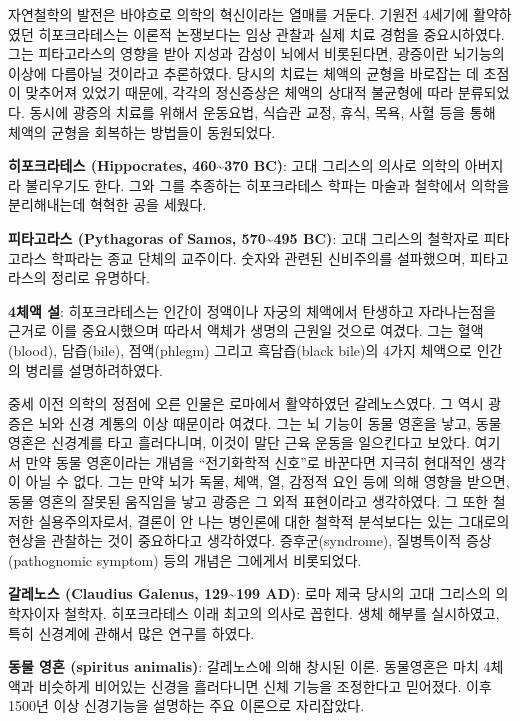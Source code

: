 \documentclass[
]{article}
\begin{document}
자연철학의 발전은 바야흐로 의학의 혁신이라는 열매를 거둔다. 기원전
4세기에 활약하였던 히포크라테스는 이론적 논쟁보다는 임상 관찰과 실제
치료 경험을 중요시하였다. 그는 피타고라스의 영향을 받아 지성과 감성이
뇌에서 비롯된다면, 광증이란 뇌기능의 이상에 다름아닐 것이라고
추론하였다. 당시의 치료는 체액의 균형을 바로잡는 데 초점이 맞추어져
있었기 때문에, 각각의 정신증상은 체액의 상대적 불균형에 따라 분류되었다.
동시에 광증의 치료를 위해서 운동요법, 식습관 교정, 휴식, 목욕, 사혈 등을
통해 체액의 균형을 회복하는 방법들이 동원되었다.

\textbf{히포크라테스 (Hippocrates, 460\textasciitilde370 BC)}: 고대
그리스의 의사로 의학의 아버지라 불리우기도 한다. 그와 그를 추종하는
히포크라테스 학파는 마술과 철학에서 의학을 분리해내는데 혁혁한 공을
세웠다.

\textbf{피타고라스 (Pythagoras of Samos, 570\textasciitilde495 BC)}:
고대 그리스의 철학자로 피타고라스 학파라는 종교 단체의 교주이다. 숫자와
관련된 신비주의를 설파했으며, 피타고라스의 정리로 유명하다.

\textbf{4체액 설}: 히포크라테스는 인간이 정액이나 자궁의 체액에서
탄생하고 자라나는점을 근거로 이를 중요시했으며 따라서 액체가 생명의
근원일 것으로 여겼다. 그는 혈액(blood), 담즙(bile), 점액(phlegm) 그리고
흑담즙(black bile)의 4가지 체액으로 인간의 병리를 설명하려하였다.

중세 이전 의학의 정점에 오른 인물은 로마에서 활약하였던 갈레노스였다. 그
역시 광증은 뇌와 신경 계통의 이상 때문이라 여겼다. 그는 뇌 기능이 동물
영혼을 낳고, 동물 영혼은 신경계를 타고 흘러다니며, 이것이 말단 근육
운동을 일으킨다고 보았다. 여기서 만약 동물 영혼이라는 개념을
``전기화학적 신호''로 바꾼다면 지극히 현대적인 생각이 아닐 수 없다. 그는
만약 뇌가 독물, 체액, 열, 감정적 요인 등에 의해 영향을 받으면, 동물
영혼의 잘못된 움직임을 낳고 광증은 그 외적 표현이라고 생각하였다. 그
또한 철저한 실용주의자로서, 결론이 안 나는 병인론에 대한 철학적
분석보다는 있는 그대로의 현상을 관찰하는 것이 중요하다고 생각하였다.
증후군(syndrome), 질병특이적 증상(pathognomic symptom) 등의 개념은
그에게서 비롯되었다.

\textbf{갈레노스 (Claudius Galenus, 129\textasciitilde199 AD)}: 로마
제국 당시의 고대 그리스의 의학자이자 철학자. 히포크라테스 이래 최고의
의사로 꼽힌다. 생체 해부를 실시하였고, 특히 신경계에 관해서 많은 연구를
하였다.

\textbf{동물 영혼 (spiritus animalis)}: 갈레노스에 의해 창시된 이론.
동물영혼은 마치 4체액과 비슷하게 비어있는 신경을 흘러다니면 신체 기능을
조정한다고 믿어졌다. 이후 1500년 이상 신경기능을 설명하는 주요 이론으로
자리잡았다.
\end{document}
